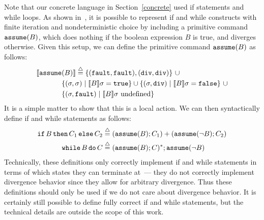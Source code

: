 Note that our concrete language in Section~\ref{concrete} used if statements 
and while loops. As shown in~\cite{coy07}, it is possible to
represent if and while constructs with finite iteration and nondeterministic choice by including a primitive command $\text{\tt{assume}}(B)$,
which does nothing if the boolean expression $B$ is true, and diverges otherwise. 
\ifextended
Given this setup, we can define the primitive command $\text{\tt{assume}}(B)$ as follows:
\begin{align*}
\llbracket \text{\tt{assume}} & (B) \rrbracket \stackrel{\triangle}{=} \{(\text{\tt{fault}},\text{\tt{fault}}),(\texttt{div},\texttt{div})\} \,\, \cup \\
& \{(\sigma,\sigma) \hspace{1mm} | \hspace{1mm} \llbracket B \rrbracket\sigma = \text{\tt{true}}\} \cup \{(\sigma,\texttt{div}) \hspace{1mm} | \hspace{1mm} \llbracket B \rrbracket\sigma = \text{\tt{false}}\} \,\, \cup \\
& \{(\sigma,\text{\tt{fault}}) \hspace{1mm} | \hspace{1mm} \llbracket B \rrbracket\sigma \text{ undefined}\}
\end{align*}
It is a simple matter to show that this is a local action. We can then syntactically define if and while statements as follows:
\begin{align*}
\text{\tt{if}} \, B \, \text{\tt{then}} \, C_1 \, \text{\tt{else}} \, C_2 & \stackrel{\triangle}{=} (\text{\tt{assume}}(B);C_1) + (\text{\tt{assume}}(\lnot B);C_2) \\
\text{\tt{while}} \, B \, \text{\tt{do}} \, C & \stackrel{\triangle}{=} (\text{\tt{assume}}(B);C)^*;\text{\tt{assume}}(\lnot B)
\end{align*}
Technically, these definitions only correctly implement if and while statements in terms of which states they can
terminate at~--- they do not correctly implement divergence behavior since they allow for arbitrary divergence. 
Thus these definitions should only be used if we do not care about divergence behavior. It is certainly
still possible to define fully correct if and while statements, but the technical details are
outside the scope of this work.
\fi

